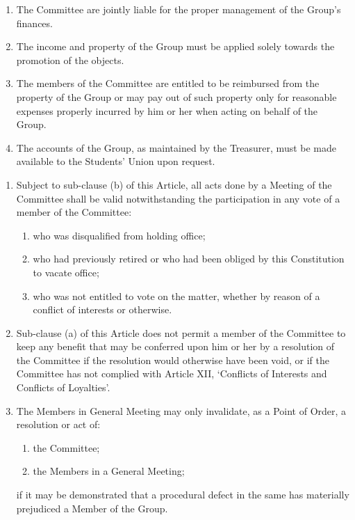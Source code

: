\documentclass[12pt]{constitution}
\begin{document}

\begin{enumerate}
    \item The Committee are jointly liable for the proper management of the Group's finances.
    \item The income and property of the Group must be applied solely towards the promotion of the objects.
    \item The members of the Committee are entitled to be reimbursed from the property of the Group or may pay out of such property only for reasonable expenses properly incurred by him or her when acting on behalf of the Group.
    \item The accounts of the Group, as maintained by the Treasurer, must be made available to the Students' Union upon request.
\end{enumerate}



\begin{enumerate}
    \item Subject to sub-clause (b) of this Article, all acts done by a Meeting of the Committee shall be valid notwithstanding the participation in any vote of a member of the Committee:
    \begin{enumerate}
        \item who was disqualified from holding office;
        \item who had previously retired or who had been obliged by this Constitution to vacate office;
        \item who was not entitled to vote on the matter, whether by reason of a conflict of interests or otherwise.
    \end{enumerate}

\item Sub-clause (a) of this Article does not permit a member of the Committee to keep any benefit that may be conferred upon him or her by a resolution of the Committee if the resolution would otherwise have been void, or if the Committee has not complied with Article XII, `Conflicts of Interests and Conflicts of Loyalties'.
    \item The Members in General Meeting may only invalidate, as a Point of Order, a resolution or act of:
    \begin{enumerate}
        \item the Committee;
        \item the Members in a General Meeting;
    \end{enumerate}
    if it may be demonstrated that a procedural defect in the same has materially prejudiced a Member of the Group.
\end{enumerate}
\end{document}
